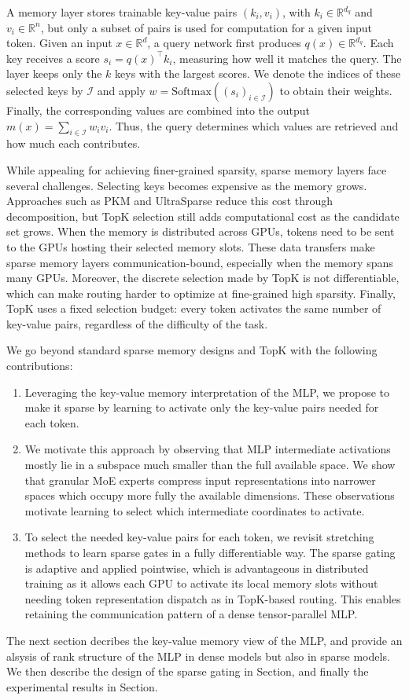 \documentclass{article} %
\begin{document}
A memory layer stores trainable key-value pairs $(k_i,v_i)$, with $k_i\in\mathbb{R}^{d_q}$ and
$v_i\in\mathbb{R}^{n}$, but only a subset of pairs is used for computation for a given input token.
Given an input $x\in\mathbb{R}^{d}$, a query network
first produces $q(x)\in\mathbb{R}^{d_q}$. Each key receives a score
$s_i=q(x)^\top k_i$, measuring how well it matches the query.
The layer keeps only the $k$ keys with the largest scores.
We denote the indices of these selected keys by $\mathcal{I}$ and apply
$w=\mathrm{Softmax}((s_i)_{i\in\mathcal{I}})$ to obtain their weights.
Finally, the corresponding values are combined into the output
$m(x)=\sum_{i\in\mathcal{I}}w_i v_i$. Thus, the query determines which values
are retrieved and how much each contributes.

While appealing for achieving finer-grained sparsity, sparse memory layers
face several challenges. Selecting keys becomes expensive as the memory grows.
Approaches such as PKM and UltraSparse reduce this cost through decomposition,
but TopK selection still adds computational cost as the candidate set grows.
When the memory is distributed across GPUs, tokens need to be sent to
the GPUs hosting their selected memory slots. These data transfers make sparse
memory layers communication-bound, especially when the memory spans many GPUs.
Moreover, the discrete selection made by TopK is not differentiable, 
which can make routing harder to optimize at fine-grained high sparsity. 
Finally, TopK uses a fixed selection budget: every token activates the same number of
key-value pairs, regardless of the difficulty of the task.

We go beyond standard sparse memory designs and TopK with the following contributions:
\begin{enumerate}
    \item Leveraging the key-value memory interpretation of the MLP, we propose to make
    it sparse by learning to activate only the key-value pairs needed for each token.
    \item We motivate this approach by observing that MLP intermediate activations mostly lie 
    in a subspace much smaller than the full available space.
    We show that granular MoE experts compress input representations into narrower
    spaces which occupy more fully the available dimensions. These observations
    motivate learning to select which intermediate coordinates to activate.
    \item To select the needed key-value pairs for each token, we revisit stretching
    methods to learn sparse gates in a fully differentiable way. 
    The sparse gating is adaptive and applied pointwise, which is advantageous
    in distributed training as it allows each GPU to activate 
    its local memory slots without needing token representation dispatch as in TopK-based routing. 
    This enables retaining the communication pattern of a dense tensor-parallel MLP.
\end{enumerate}
The next section decribes the key-value memory view of the MLP, and provide an alsysis
of rank structure of the MLP in dense models but also in sparse models.
We then describe the design of the sparse gating in Section, and finally the experimental
results in Section.
\end{document}

